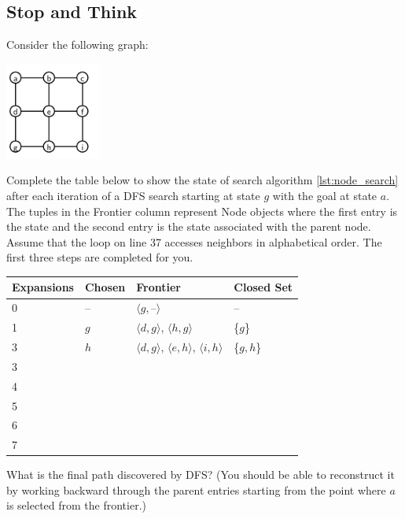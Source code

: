 \subsection*{Stop and Think}

\begin{exercise}
  Consider the following graph:

  \includegraphics[width=1.25in]{planning/figs/exercises/hw_graph_no_weights.pdf}
  
  Complete the table below to show the state of search algorithm
  \ref{lst:node_search} after each iteration of a DFS search starting
  at state $g$ with the goal at state $a$.  The tuples in the Frontier
  column represent Node objects where the first entry is the state and
  the second entry is the state associated with the parent node.
  Assume that the loop on line 37 accesses neighbors in
  alphabetical order.  The first three steps are completed for you.

  \begin{center}
\begin{tabular}{|l|l|p{3in}|p{1in}|}
  \hline
  Expansions & Chosen  & Frontier & Closed Set \\
  \hline
  0 & -- & $\langle g, \text{--} \rangle$& --\\
  \hline
  1&$g$& $\langle d, g \rangle$, $\langle h, g \rangle$& \{$g$\}\\
  \hline
    3& $h$ & $\langle d, g \rangle$,  $\langle e, h \rangle$, $\langle i, h \rangle$  & \{$g, h$\} \\
    \hline
    3&&&\\
    \hline
    4&&&\\
    \hline
    5&&&\\
    \hline
    6&&&\\
    \hline
    7&&&\\
    \hline
\end{tabular}
\end{center}

  What is the final path discovered by DFS?  (You should be able to reconstruct it by working backward through the parent entries starting from the point where $a$ is selected from the frontier.)
\end{exercise}

